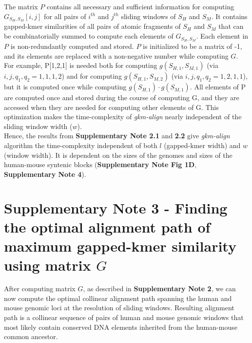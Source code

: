 \documentclass[english]{article}
\begin{document}
The matrix $P$ contains all necessary and sufficient information for computing $G_{S_H, S_M}[i,j]$ for all pairs of $i^{th}$ and $j^{th}$ sliding windows of $S_H$ and $S_M$. It contains gapped-kmer similarities of all pairs of atomic fragments of $S_H$ and $S_M$ that can be combinatorially summed to compute each elements of $G_{S_H, S_M}$. Each element in $P$ is non-redundantly computed and stored. $P$ is initialized to be a matrix of -1, and its elements are replaced with a non-negative number while computing $G$. For example, P[1,2,1] is needed both for computing $g(S_{H,1}, S_{M,1})$ (via $i,j,q_1,q_2=1,1,1,2$) and for computing $g(S_{H,1}, S_{M,2})$ (via $i,j,q_1,q_2=1,2,1,1$), but it is computed once while computing $g(S_{H,1}) \cdot g(S_{M,1})$. All elements of P are computed once and stored during the course of computing G, and they are accessed when they are needed for computing other elements of G. This optimization makes the time-complexity of \textit{gkm-align} nearly independent of the sliding window width ($w$). \\

Hence, the results from \textbf{Supplementary Note 2.1} and  \textbf{2.2} give \textit{gkm-align} algorithm the time-complexity independent of both $l$ (gapped-kmer width) and $w$ (window width). It is dependent on the sizes of the genomes and sizes of the human-mouse syntenic blocks (\textbf{Supplementary Note Fig 1D}, \textbf{Supplementary Note 4}).


\section{Supplementary Note 3 - Finding the optimal alignment path of maximum gapped-kmer similarity using matrix $G$}
After computing matrix $G$, as described in \textbf{Supplementary Note 2}, we can now compute the optimal collinear alignment path spanning the human and mouse genomic loci at the resolution of sliding windows. Resulting alignment path is a collinear sequence of pairs of human and mouse genomic windows that most likely contain conserved DNA elements inherited from the human-mouse common ancestor. \\
\end{document}
